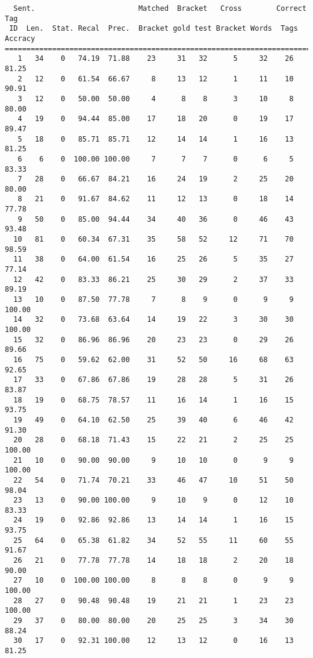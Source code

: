 \scriptsize
\begin{verbatim}
  Sent.                        Matched  Bracket   Cross        Correct Tag
 ID  Len.  Stat. Recal  Prec.  Bracket gold test Bracket Words  Tags Accracy
============================================================================
   1   34    0   74.19  71.88    23     31   32      5     32    26    81.25
   2   12    0   61.54  66.67     8     13   12      1     11    10    90.91
   3   12    0   50.00  50.00     4      8    8      3     10     8    80.00
   4   19    0   94.44  85.00    17     18   20      0     19    17    89.47
   5   18    0   85.71  85.71    12     14   14      1     16    13    81.25
   6    6    0  100.00 100.00     7      7    7      0      6     5    83.33
   7   28    0   66.67  84.21    16     24   19      2     25    20    80.00
   8   21    0   91.67  84.62    11     12   13      0     18    14    77.78
   9   50    0   85.00  94.44    34     40   36      0     46    43    93.48
  10   81    0   60.34  67.31    35     58   52     12     71    70    98.59
  11   38    0   64.00  61.54    16     25   26      5     35    27    77.14
  12   42    0   83.33  86.21    25     30   29      2     37    33    89.19
  13   10    0   87.50  77.78     7      8    9      0      9     9   100.00
  14   32    0   73.68  63.64    14     19   22      3     30    30   100.00
  15   32    0   86.96  86.96    20     23   23      0     29    26    89.66
  16   75    0   59.62  62.00    31     52   50     16     68    63    92.65
  17   33    0   67.86  67.86    19     28   28      5     31    26    83.87
  18   19    0   68.75  78.57    11     16   14      1     16    15    93.75
  19   49    0   64.10  62.50    25     39   40      6     46    42    91.30
  20   28    0   68.18  71.43    15     22   21      2     25    25   100.00
  21   10    0   90.00  90.00     9     10   10      0      9     9   100.00
  22   54    0   71.74  70.21    33     46   47     10     51    50    98.04
  23   13    0   90.00 100.00     9     10    9      0     12    10    83.33
  24   19    0   92.86  92.86    13     14   14      1     16    15    93.75
  25   64    0   65.38  61.82    34     52   55     11     60    55    91.67
  26   21    0   77.78  77.78    14     18   18      2     20    18    90.00
  27   10    0  100.00 100.00     8      8    8      0      9     9   100.00
  28   27    0   90.48  90.48    19     21   21      1     23    23   100.00
  29   37    0   80.00  80.00    20     25   25      3     34    30    88.24
  30   17    0   92.31 100.00    12     13   12      0     16    13    81.25

\end{verbatim}
